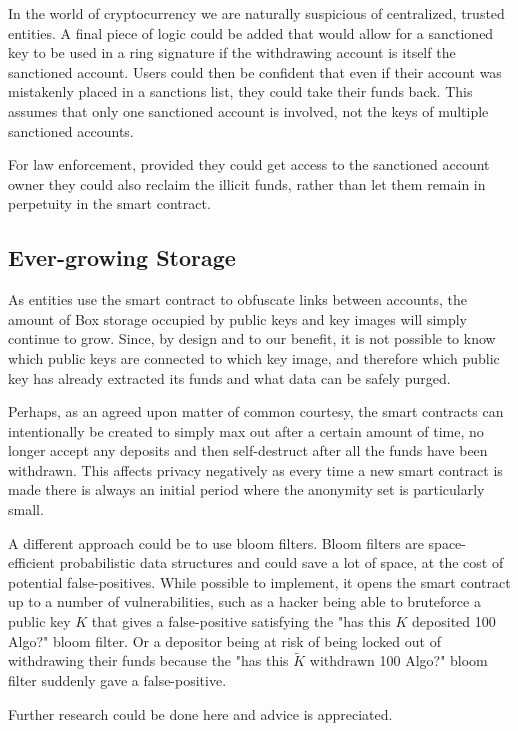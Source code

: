 \documentclass[9pt]{article}
\begin{document}
In the world of cryptocurrency we are naturally suspicious of centralized, trusted entities. A final piece of logic could be added that would allow for a sanctioned key to be used in a ring signature if the withdrawing account is itself the sanctioned account. Users could then be confident that even if their account was mistakenly placed in a sanctions list, they could take their funds back. This assumes that only one sanctioned account is involved, not the keys of multiple sanctioned accounts.

For law enforcement, provided they could get access to the sanctioned account owner they could also reclaim the illicit funds, rather than let them remain in perpetuity in the smart contract.


\subsection{Ever-growing Storage}

As entities use the smart contract to obfuscate links between accounts, the amount of Box storage occupied by public keys and key images will simply continue to grow. Since, by design and to our benefit, it is not possible to know which public keys are connected to which key image, and therefore which public key has already extracted its funds and what data can be safely purged.

Perhaps, as an agreed upon matter of common courtesy, the smart contracts can intentionally be created to simply max out after a certain amount of time,  no longer accept any deposits and then self-destruct after all the funds have been withdrawn. This affects privacy negatively as every time a new smart contract is made there is always an initial period where the anonymity set is particularly small.

A different approach could be to use bloom filters. Bloom filters are space-efficient probabilistic data structures and could save a lot of space, at the cost of potential false-positives. While possible to implement, it opens the smart contract up to a number of vulnerabilities, such as a hacker being able to bruteforce a public key $K$ that gives a false-positive satisfying the "has this $K$ deposited 100 Algo?" bloom filter. Or a depositor being at risk of being locked out of withdrawing their funds because the "has this $\tilde{K}$ withdrawn 100 Algo?" bloom filter suddenly gave a false-positive.

Further research could be done here and advice is appreciated.
\end{document}
